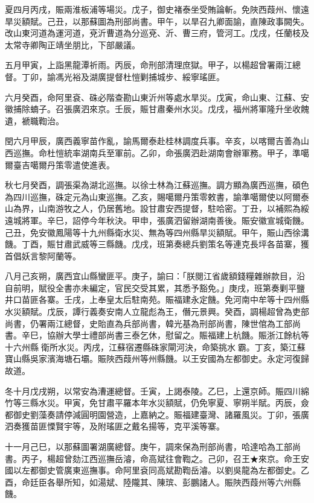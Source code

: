 \begin{pinyinscope}
夏四月丙戌，賑兩淮板浦等場災。戊子，御史褚泰坐受賄論斬。免陜西葭州、懷遠旱災額賦。己丑，以那蘇圖為刑部尚書。甲午，以旱召九卿面諭，直陳政事闕失。改山東河道為運河道，兗沂曹道為分巡兗、沂、曹三府，管河工。戊戌，任蘭枝及太常寺卿陶正靖坐朋比，下部嚴議。

五月甲寅，上詣黑龍潭祈雨。丙辰，命刑部清理庶獄。甲子，以楊超曾署兩江總督。丁卯，諭馮光裕及湖廣提督杜愷剿捕城步、綏寧瑤匪。

六月癸酉，命阿里袞、硃必階查勘山東沂州等處水旱災。戊寅，命山東、江蘇、安徽捕除蝻子。召張廣泗來京。壬辰，賑甘肅秦州水災。戊戌，福州將軍隆升坐收餽遺，褫職鞫治。

閏六月甲辰，廣西義寧苗作亂，諭馬爾泰赴桂林調度兵事。辛亥，以喀爾吉善為山西巡撫。命杜愷統率湖南兵至軍前。乙卯，命張廣泗赴湖南會辦軍務。甲子，準噶爾臺吉噶爾丹策零遣使進表。

秋七月癸酉，調張渠為湖北巡撫。以徐士林為江蘇巡撫。調方顯為廣西巡撫，碩色為四川巡撫，硃定元為山東巡撫。乙亥，賜噶爾丹策零敕書，諭準噶爾使以阿爾泰山為界，山南游牧之人，仍居舊地。設甘肅安西提督，駐哈密。丁丑，以補熙為綏遠城將軍。辛巳，詔停今年秋決。甲申，張廣泗留辦湖南善後。賑安徽宣城衛饑。己丑，免安徽鳳陽等十九州縣衛水災、無為等四州縣旱災額賦。甲午，賑山西徐溝饑。丁酉，賑甘肅武威等三縣饑。戊戌，班第奏總兵劉策名等連克長坪各苗寨，獲首倡妖言黎阿蘭等。

八月己亥朔，廣西宜山縣蠻匪平。庚子，諭曰：「朕閱江省歲額錢糧雜辦款目，沿自前明，賦役全書亦未編定，官民交受其累，其悉予豁免。」庚戌，班第奏剿平鹽井口苗匪各寨。壬戌，上奉皇太后駐南苑。賑福建永定饑。免河南中牟等十四州縣水災額賦。戊辰，譚行義奏安南人立龍彪為王，僭元景興。癸酉，調楊超曾為吏部尚書，仍署兩江總督，史貽直為兵部尚書，韓光基為刑部尚書，陳世倌為工部尚書。辛巳，協辦大學士禮部尚書三泰乞休，慰留之。賑福建上杭饑。賑浙江餘杭等十六州縣衛所水災。丙戌，江蘇宿遷縣硃家閘河決，命築挑水霸。丁亥，築江蘇寶山縣吳家濱海塘石壩。賑陜西葭州等州縣饑。以王安國為左都御史。永定河復歸故道。

冬十月戊戌朔，以常安為漕運總督。壬寅，上謁泰陵。乙巳，上還京師。賑四川綿竹等三縣水災。甲寅，免甘肅平羅本年水災額賦，仍免寧夏、寧朔半賦。丙辰，僉都御史劉藻奏請停減圓明園營造，上嘉納之。賑福建臺灣、諸羅風災。丁卯，張廣泗奏獲苗匪慄賢宇等，及附瑤匪之戴名揚等，克平溪等寨。

十一月己巳，以那蘇圖署湖廣總督。庚午，調來保為刑部尚書，哈達哈為工部尚書。丙子，楊超曾劾江西巡撫岳濬，命高斌往會鞫之。己卯，召王★來京。命王安國以左都御史管廣東巡撫事。命阿里袞同高斌勘鞫岳濬。以劉吳龍為左都御史。乙酉，命廷臣各舉所知，如湯斌、陸隴其、陳瑸、彭鵬諸人。賑陜西葭州等六州縣饑。


\end{pinyinscope}
